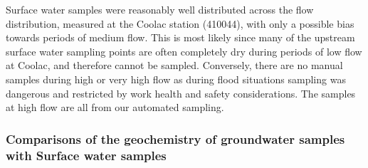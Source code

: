 \documentclass[, manuscript]{copernicus}
\begin{document}
Surface water samples were reasonably well distributed across the flow
distribution, measured at the Coolac station (410044), with only a
possible bias towards periods of medium flow. This is most likely since
many of the upstream surface water sampling points are often completely
dry during periods of low flow at Coolac, and therefore cannot be
sampled. Conversely, there are no manual samples during high or very
high flow as during flood situations sampling was dangerous and
restricted by work health and safety considerations. The samples at high
flow are all from our automated sampling.

\subsubsection{Comparisons of the geochemistry of groundwater samples
with Surface water samples}
\end{document}

